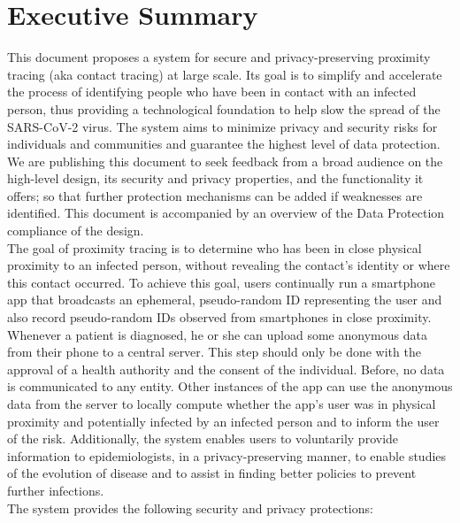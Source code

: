 \documentclass[12pt,a4paper]{article}
\begin{document}
\section*{Executive Summary}
This document proposes a system for secure and privacy-preserving proximity tracing (aka
contact tracing) at large scale. Its goal is to simplify and accelerate the process of identifying people who have been in contact with an infected person, thus providing a technological foundation to help slow the spread of the SARS-CoV-2 virus. The system aims to minimize privacy and security risks for individuals and communities and guarantee the highest level of data protection.\\[0.3cm]
We are publishing this document to seek feedback from a broad audience on the high-level
design, its security and privacy properties, and the functionality it offers; so that further protection mechanisms can be added if weaknesses are identified. This document is
accompanied by an overview of the Data Protection compliance of the design.\\[0.3cm]
The goal of proximity tracing is to determine who has been in close physical proximity to an infected person, without revealing the contact’s identity or where this contact occurred. To achieve this goal, users continually run a smartphone app that broadcasts an ephemeral, pseudo-random ID representing the user and also record pseudo-random IDs observed from smartphones in close proximity. Whenever a patient is diagnosed, he or she can upload some anonymous data from their phone to a central server. This step should only be done  with the approval of a health authority and the consent of the individual. Before, no data is communicated to any entity. Other instances of the app can use the anonymous data from the server to locally compute whether the app’s user was in physical proximity and potentially infected by an infected person and to inform the user of the risk. Additionally, the system enables users to voluntarily provide information to epidemiologists, in a privacy-preserving manner, to enable studies of the evolution of disease and to assist in finding better policies to prevent further infections.\\[0.3cm]
The system provides the following security and privacy protections:
\end{document}
